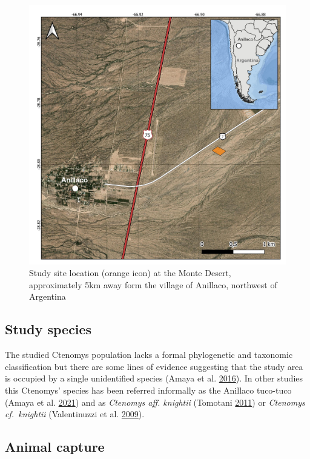 \documentclass[msc,numbers,hidelinks]{coppe}
\begin{document}
  \begin{figure}
  \includegraphics[width=1\linewidth]{../04_figures/map/tuco_map} \caption{Study site location (orange icon) at the Monte Desert, approximately 5km away form the village of Anillaco, northwest of Argentina}\label{fig:methods-map}
  \end{figure}
  \hypertarget{study-species}{%
  \subsection{Study species}\label{study-species}}

  The studied Ctenomys population lacks a formal phylogenetic and taxonomic classification but there are some lines of evidence suggesting that the study area is occupied by a single unidentified species (Amaya et al. \protect\hyperlink{ref-amayaFormFunctionLongrange2016}{2016}). In other studies this Ctenomys' species has been referred informally as the Anillaco tuco-tuco (Amaya et al. \protect\hyperlink{ref-amayaDynamicSpatialOverlap2021}{2021}) and as \emph{Ctenomys aff. knightii} (Tomotani \protect\hyperlink{ref-tomotaniPosefeitosSincronizacaoEm2011}{2011}) or \emph{Ctenomys cf.~knightii} (Valentinuzzi et al. \protect\hyperlink{ref-valentinuzziCircadianPatternWheel2009}{2009}).

  \hypertarget{animal-capture}{%
  \subsection{Animal capture}\label{animal-capture}}
\end{document}
